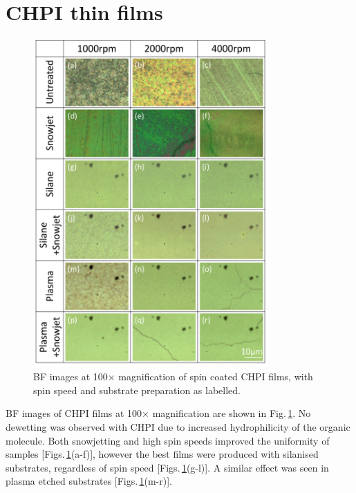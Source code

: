 \section{CHPI thin films}
\begin{figure}[h!] 
\centering    
\includegraphics[width=0.8\textwidth]{Fig5}
\caption{BF images at 100$\times$ magnification of spin coated CHPI films, with spin speed and substrate preparation as labelled.}
\label{4Fig5}
\end{figure}
BF images of CHPI films at 100$\times$ magnification are shown in Fig.\,\ref{4Fig5}. No dewetting was observed with CHPI due to increased hydrophilicity of the organic molecule. Both snowjetting and high spin speeds improved the uniformity of samples [Figs.\,\ref{4Fig5}(a-f)], however the best films were produced with silanised substrates, regardless of spin speed [Figs.\,\ref{4Fig5}(g-l)]. A similar effect was seen in plasma etched substrates [Figs.\,\ref{4Fig5}(m-r)].

